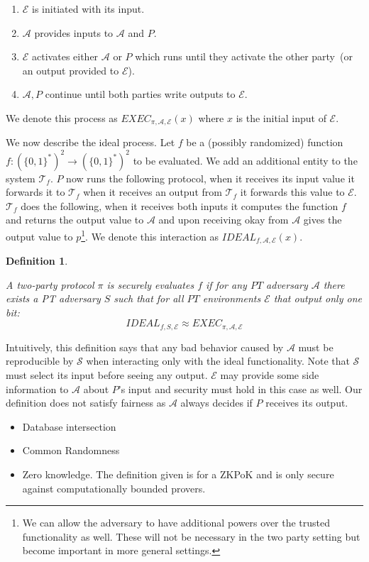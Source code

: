 \documentclass{article}
\newtheorem{defn}[thm]{Definition}
\newenvironment{definition}{\begin{defn}\begin{em}}%
{\end{em}\end{defn}}
\begin{document}
\begin{enumerate}
\item $\mathcal{E}$ is initiated with its input.
\item $\mathcal{A}$ provides inputs to $\mathcal{A}$ and $P$.
\item $\mathcal{E}$ activates either $\mathcal{A}$ or $P$ which runs until they activate the other party~(or an output provided to $\mathcal{E}$).
\item $\mathcal{A}, P$ continue until both parties write outputs to $\mathcal{E}$.
\end{enumerate}

We denote this process as $EXEC_{\pi, \mathcal{A, E}}(x)$ where $x$ is the initial input of $\mathcal{E}$.

We now describe the ideal process.  Let $f$ be a (possibly randomized) function $f:(\{0,1\}^*)^2\rightarrow (\{0,1\}^*)^2$ to be evaluated.  We add an additional entity to the system $\mathcal{T}_f$.  $P$ now runs the following protocol, when it receives its input value it forwards it to $\mathcal{T}_f$ when it receives an output from $\mathcal{T}_f$ it forwards this value to $\mathcal{E}$.  $\mathcal{T}_f$ does the following, when it receives both inputs it computes the function $f$ and returns the output value to $\mathcal{A}$ and upon receiving okay from $\mathcal{A}$ gives the output value to $p$\footnote{We can allow the adversary to have additional powers over the trusted functionality as well.  These will not be necessary in the two party setting but become important in more general settings.}.  We denote this interaction as $IDEAL_{f,\mathcal{A}, \mathcal{E}}(x)$.

\begin{definition}
A two-party protocol $\pi$ is securely evaluates $f$ if for any $PT$ adversary $\mathcal{A}$ there exists a PT adversary $S$ such that for all $PT$ environments $\mathcal{E}$ that output only one bit:
\[
IDEAL_{f,S,\mathcal{E}}\approx EXEC_{\pi, \mathcal{A}, \mathcal{E}}
\]
\end{definition}

Intuitively, this definition says that any bad behavior caused by $\mathcal{A}$ must be reproducible by $\mathcal{S}$ when interacting only with the ideal functionality.  Note that $\mathcal{S}$ must select its input before seeing any output.  $\mathcal{E}$ may provide some side information to $\mathcal{A}$ about $P$'s input and security must hold in this case as well.  Our definition does not satisfy fairness as $\mathcal{A}$ always decides if $P$ receives its output.
\begin{itemize}
\item Database intersection
\item Common Randomness
\item Zero knowledge.  The definition given is for a ZKPoK and is only secure against computationally bounded provers.
\end{itemize}
\end{document}
